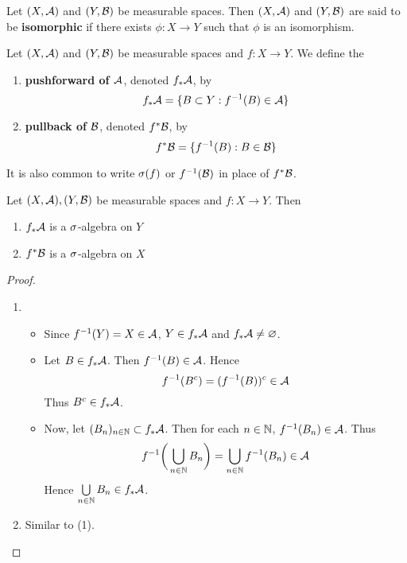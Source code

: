 \documentclass{book}
\begin{document}
	\begin{defn} 
		Let $(X, \mathcal{A})$ and $(Y, \mathcal{B})$ be measurable spaces. Then $(X, \mathcal{A})$ and $(Y, \mathcal{B})$ are said to be \textbf{isomorphic} if there exists $\phi:X \rightarrow Y$ such that $\phi$ is an isomorphism.
	\end{defn}
	
	\begin{defn} 
		Let $(X, \mathcal{A})$ and $(Y,\mathcal{B})$ be measurable spaces and $f: X \rightarrow Y$. We define the 
		\begin{enumerate}
			\item \textbf{pushforward of $\mathcal{A}$}, denoted $f_*\mathcal{A}$, by 
			$$f_*\mathcal{A} = \{B \subset Y: f^{-1}(B) \in \mathcal{A}\}$$ 
			\item  \textbf{pullback of $\mathcal{B}$}, denoted $f^*\mathcal{B}$, by  
			$$f^*\mathcal{B} = \{f^{-1}(B):  B \in \mathcal{B} \}$$
		\end{enumerate}
	\end{defn}
	
	\begin{note}
		It is also common to write $\sigma(f)$ or $f^{-1}(\mathcal{B})$ in place of $f^*\mathcal{B}$.
	\end{note}	
	
	\begin{ex}  
		Let $(X,\mathcal{A}), (Y,\mathcal{B})$ be measurable spaces and $f: X \rightarrow Y$. Then 
		\begin{enumerate}
			\item $f_*\mathcal{A}$ is a $\sigma$-algebra on $Y$
			\item $f^*\mathcal{B}$ is a $\sigma$-algebra on $X$
		\end{enumerate}
	\end{ex}
	
	\begin{proof}\
		\begin{enumerate}
			\item 
			\begin{itemize}
				\item Since $f^{-1}(Y) = X \in \mathcal{A}$, $Y \in f_*\mathcal{A}$ and $f_*\mathcal{A} \neq \varnothing$. 
				\item Let $B \in f_*\mathcal{A}$. Then $f^{-1}(B) \in \mathcal{A}$. Hence $$f^{-1}(B^c) = (f^{-1}(B))^c \in \mathcal{A}$$ Thus $B^c \in f_*\mathcal{A}$. 
				\item Now, let $(B_n)_{n \in \mathbb{N}} \subset f_*\mathcal{A}$. Then for each $n \in \mathbb{N}$, $f^{-1}(B_n) \in \mathcal{A}$. Thus $$f^{-1}\bigg(\bigcup_{n \in \mathbb{N}} B_n \bigg) = \bigcup_{n \in \mathbb{N}} f^{-1}(B_n) \in \mathcal{A}$$ Hence $\bigcup\limits_{n \in \mathbb{N}} B_n \in f_*\mathcal{A}$.
			\end{itemize}
			\item Similar to (1).
		\end{enumerate}
	\end{proof}
\end{document}
